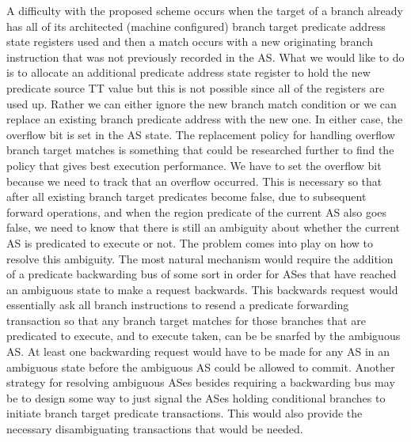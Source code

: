 \documentclass[10pt,dvips]{article}
\begin{document}
A difficulty with the proposed scheme occurs when the target of a
branch already has all of its architected (machine configured) branch
target predicate address state registers used and then a
match occurs with a new originating branch instruction that was not
previously recorded in the AS.  What we would like to do is to allocate
an additional predicate address state register to hold the new
predicate source TT value but this is not possible since all of the
registers are used up.  Rather we can either ignore the new branch
match condition or we can replace an existing branch predicate address
with the new one.  In either case, the overflow bit is set in the AS
state.  The replacement policy for handling overflow branch target
matches is something that could be researched further 
to find the policy
that gives best execution performance.  
We have to set the overflow bit
because we need to track that an overflow occurred.  
This is necessary so that after all existing branch target 
predicates become false,
due to subsequent forward operations,
and when the region predicate of the current AS also goes false, we need
to know that there is still an ambiguity about whether the current AS
is predicated to execute or not.  The problem comes into play on how to
resolve this ambiguity.  The most natural mechanism would require the
addition of a predicate backwarding bus of some sort in order for
ASes that have reached an ambiguous state to make a request backwards.
This backwards request would essentially ask all branch instructions
to resend a predicate forwarding transaction so that any branch target
matches for those branches that are predicated to execute, and to
execute taken, can be be snarfed by the ambiguous AS.  At least
one backwarding request would have to be made for any AS in an
ambiguous state before the ambiguous AS could be allowed to commit.
Another strategy for resolving ambiguous ASes besides requiring
a backwarding bus may be to design some way to just signal
the ASes holding conditional branches to initiate branch target
predicate transactions.  This would also provide the necessary
disambiguating transactions that would be needed.
%
\end{document}
